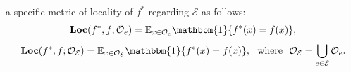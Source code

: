 \documentclass[acmsmall, screen]{acmart}
\begin{document}
a specific metric of locality of $f^{*}$ regarding $\mathcal{E}$ as follows:
\begin{equation}
            \textbf{Loc}(f^{*}, f; \mathcal{O}_{e}) = \mathbb{E}_{x \in\mathcal{O}_{e} } \mathbbm{1}\{f^*(x)= f(x)\},
\end{equation}
\begin{equation}
        \textbf{Loc}(f^{*}, f; \mathcal{O}_{\mathcal{E}})=\mathbb{E}_{x \in \mathcal{O}_{\mathcal{E}}} \mathbbm{1}\{f^*(x)= f(x)\}, \ \ \text{where}\ \ \mathcal{O}_{\mathcal{E}}=\bigcup_{e\in\mathcal{E}}\mathcal{O}_e.
\end{equation}


\end{document}
